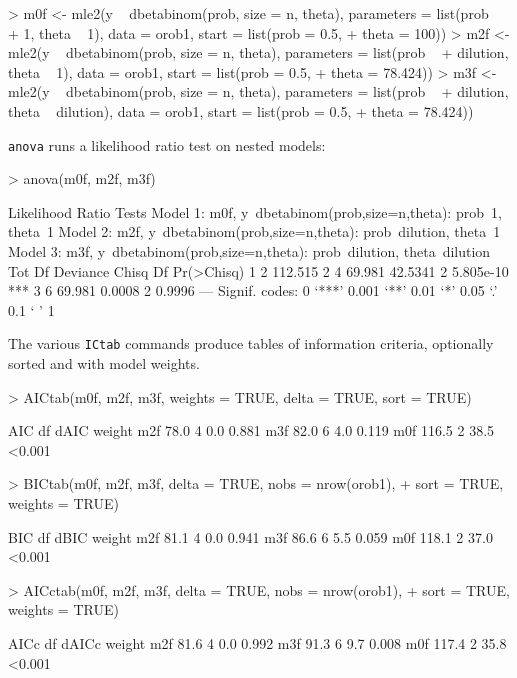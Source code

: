 \documentclass{article}
\newcommand{\code}[1]{{\tt #1}}
\begin{document}
\begin{Schunk}
\begin{Sinput}
> m0f <- mle2(y ~ dbetabinom(prob, size = n, theta), parameters = list(prob ~ 
+     1, theta ~ 1), data = orob1, start = list(prob = 0.5, 
+     theta = 100))
> m2f <- mle2(y ~ dbetabinom(prob, size = n, theta), parameters = list(prob ~ 
+     dilution, theta ~ 1), data = orob1, start = list(prob = 0.5, 
+     theta = 78.424))
> m3f <- mle2(y ~ dbetabinom(prob, size = n, theta), parameters = list(prob ~ 
+     dilution, theta ~ dilution), data = orob1, start = list(prob = 0.5, 
+     theta = 78.424))
\end{Sinput}
\end{Schunk}

\code{anova} runs a likelihood ratio test on nested
models:
\begin{Schunk}
\begin{Sinput}
> anova(m0f, m2f, m3f)
\end{Sinput}
\begin{Soutput}
Likelihood Ratio Tests
Model 1: m0f, y~dbetabinom(prob,size=n,theta): prob~1, theta~1
Model 2: m2f, y~dbetabinom(prob,size=n,theta): prob~dilution, theta~1
Model 3: m3f, y~dbetabinom(prob,size=n,theta): prob~dilution,
          theta~dilution
  Tot Df Deviance   Chisq Df Pr(>Chisq)    
1      2  112.515                          
2      4   69.981 42.5341  2  5.805e-10 ***
3      6   69.981  0.0008  2     0.9996    
---
Signif. codes:  0 ‘***’ 0.001 ‘**’ 0.01 ‘*’ 0.05 ‘.’ 0.1 ‘ ’ 1 
\end{Soutput}
\end{Schunk}

The various \code{ICtab} commands produce tables of
information criteria, optionally sorted and
with model weights.
\begin{Schunk}
\begin{Sinput}
> AICtab(m0f, m2f, m3f, weights = TRUE, delta = TRUE, sort = TRUE)
\end{Sinput}
\begin{Soutput}
    AIC   df dAIC  weight
m2f  78.0 4    0.0 0.881 
m3f  82.0 6    4.0 0.119 
m0f 116.5 2   38.5 <0.001
\end{Soutput}
\begin{Sinput}
> BICtab(m0f, m2f, m3f, delta = TRUE, nobs = nrow(orob1), 
+     sort = TRUE, weights = TRUE)
\end{Sinput}
\begin{Soutput}
    BIC   df dBIC  weight
m2f  81.1 4    0.0 0.941 
m3f  86.6 6    5.5 0.059 
m0f 118.1 2   37.0 <0.001
\end{Soutput}
\begin{Sinput}
> AICctab(m0f, m2f, m3f, delta = TRUE, nobs = nrow(orob1), 
+     sort = TRUE, weights = TRUE)
\end{Sinput}
\begin{Soutput}
    AICc  df dAICc weight
m2f  81.6 4    0.0 0.992 
m3f  91.3 6    9.7 0.008 
m0f 117.4 2   35.8 <0.001
\end{Soutput}
\end{Schunk}
\end{document}
